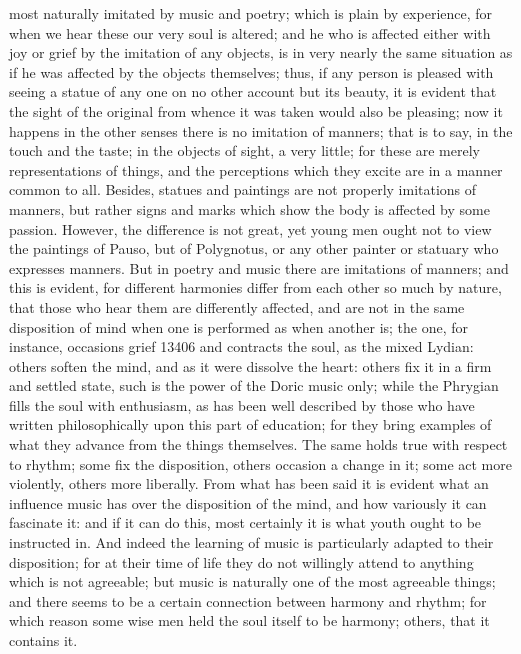 \documentclass[12pt]{article}
\begin{document}
most naturally imitated by music and poetry; which is plain by experience, for when we hear these our very soul is altered; and he who is affected either with joy or grief by the imitation of any objects, is in very nearly the same situation as if he was affected by the objects themselves; thus, if any person is pleased with seeing a statue of any one on no other account but its beauty, it is evident that the sight of the original from whence it was taken would also be pleasing; now it happens in the other senses there is no imitation of manners; that is to say, in the touch and the taste; in the objects of sight, a very little; for these are merely representations of things, and the perceptions which they excite are in a manner common to all. Besides, statues and paintings are not properly imitations of manners, but rather signs and marks which show the body is affected by some passion. However, the difference is not great, yet young men ought not to view the paintings of Pauso, but of Polygnotus, or any other painter or statuary who expresses manners. But in poetry and music there are imitations of manners; and this is evident, for different harmonies differ from each other so much by nature, that those who hear them are differently affected, and are not in the same disposition of mind when one is performed as when another is; the one, for instance, occasions grief 13406 and contracts the soul, as the mixed Lydian: others soften the mind, and as it were dissolve the heart: others fix it in a firm and settled state, such is the power of the Doric music only; while the Phrygian fills the soul with enthusiasm, as has been well described by those who have written philosophically upon this part of education; for they bring examples of what they advance from the things themselves. The same holds true with respect to rhythm; some fix the disposition, others occasion a change in it; some act more violently, others more liberally. From what has been said it is evident what an influence music has over the disposition of the mind, and how variously it can fascinate it: and if it can do this, most certainly it is what youth ought to be instructed in. And indeed the learning of music is particularly adapted to their disposition; for at their time of life they do not willingly attend to anything which is not agreeable; but music is naturally one of the most agreeable things; and there seems to be a certain connection between harmony and rhythm; for which reason some wise men held the soul itself to be harmony; others, that it contains it.
\end{document}

